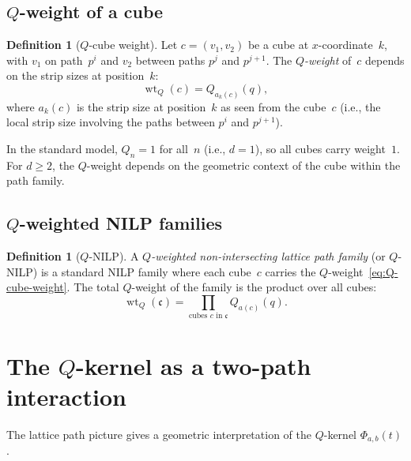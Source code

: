 \documentclass[11pt]{article}
\DeclareMathOperator{\wt}{wt}
\theoremstyle{plain}
\theoremstyle{definition}
\newtheorem{definition}[theorem]{Definition}
\begin{document}
\subsection{$Q$-weight of a cube}

\begin{definition}[$Q$-cube weight]
\label{def:Q-cube}
Let $c = (v_1, v_2)$ be a cube at $x$-coordinate~$k$, with
$v_1$ on path~$p^i$ and $v_2$ between paths $p^j$ and
$p^{j+1}$.  The \emph{$Q$-weight} of~$c$ depends on the
strip sizes at position~$k$:
\begin{equation}\label{eq:Q-cube-weight}
  \wt_Q(c) = Q_{a_k(c)}(q),
\end{equation}
where $a_k(c)$ is the strip size at position~$k$ as seen from
the cube~$c$ (i.e., the local strip size involving the paths
between $p^i$ and $p^{j+1}$).
\end{definition}

In the standard model, $Q_n = 1$ for all~$n$ (i.e., $d = 1$),
so all cubes carry weight~$1$.  For $d \geq 2$, the $Q$-weight
depends on the geometric context of the cube within the path
family.


\subsection{$Q$-weighted NILP families}

\begin{definition}[$Q$-NILP]
\label{def:Q-NILP}
A \emph{$Q$-weighted non-intersecting lattice path family}
(or $Q$-NILP) is a standard NILP family where each cube~$c$
carries the $Q$-weight~\eqref{eq:Q-cube-weight}.  The total
$Q$-weight of the family is the product over all cubes:
\begin{equation}\label{eq:total-Q-weight}
  \wt_Q(\mathfrak{c})
  = \prod_{\text{cubes } c \text{ in } \mathfrak{c}}
    Q_{a(c)}(q).
\end{equation}
\end{definition}


\section{The $Q$-kernel as a two-path interaction}
\label{sec:two-path}

The lattice path picture gives a geometric interpretation of
the $Q$-kernel $\Phi_{a,b}(t)$.
\end{document}
